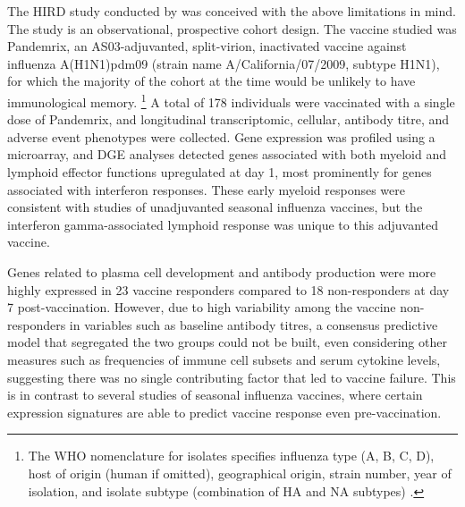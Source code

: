 The \gls{HIRD} study conducted by \textcite{sobolev2016AdjuvantedInfluenzaH1N1Vaccination} was conceived with the above limitations in mind.
The study is an observational, prospective cohort design.
The vaccine studied was Pandemrix, an AS03-adjuvanted, split-virion, inactivated vaccine against influenza A(H1N1)pdm09 (strain name A/California/07/2009, subtype H1N1), for which the majority of the cohort at the time would be unlikely to have immunological memory.
\footnote{
    The \gls{WHO} nomenclature for isolates specifies influenza type (A, B, C, D), host of origin (human if omitted), geographical origin, strain number, year of isolation, and isolate subtype (combination of \gls{HA} and \gls{NA} subtypes) \autocite{worldhealthorganization1980RevisionSystemNomenclature}.
}
A total of 178 individuals were vaccinated with a single dose of Pandemrix, and longitudinal transcriptomic, cellular, antibody
titre, and adverse event phenotypes were collected.
Gene expression was profiled using a microarray, and \gls{DGE} analyses detected genes associated with both myeloid and lymphoid effector functions upregulated at day 1, most prominently for genes associated with interferon responses.
These early myeloid responses were consistent with studies of unadjuvanted seasonal influenza vaccines, but the interferon gamma-associated lymphoid response was unique to this adjuvanted vaccine.

Genes related to plasma cell development and antibody production were more highly expressed in 23 vaccine responders compared to 18 non-responders at day 7 post-vaccination.
However, due to high variability among the vaccine non-responders in variables such as baseline antibody titres, a consensus predictive model that segregated the two groups could not be built, even considering other measures such as frequencies of immune cell subsets and serum cytokine levels, suggesting there was no single contributing factor that led to vaccine failure.
This is in contrast to several studies of seasonal influenza vaccines, where certain expression signatures are able to predict vaccine response even pre-vaccination\autocite{furman2013ApoptosisOtherImmune, tsang2014GlobalAnalysesHuman, nakaya2015SystemsAnalysisImmunity, hipc-chisignaturesprojectteam2017MulticohortAnalysisReveals}.

